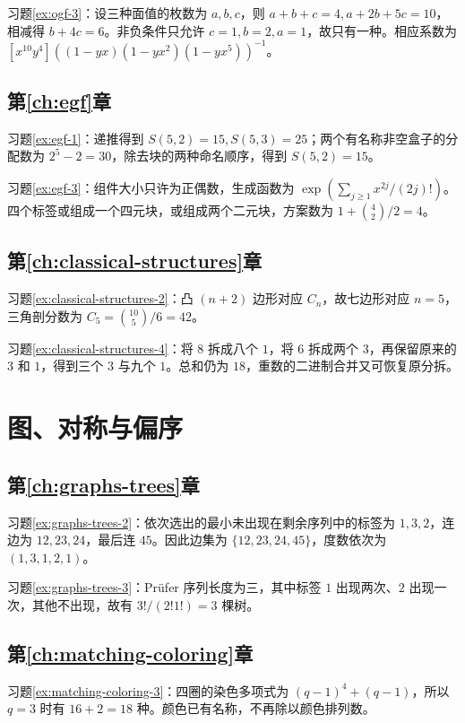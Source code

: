 习题\ref{ex:ogf-3}：设三种面值的枚数为 $a,b,c$，则 $a+b+c=4,a+2b+5c=10$，相减得 $b+4c=6$。非负条件只允许 $c=1,b=2,a=1$，故只有一种。相应系数为 $[x^{10}y^4]((1-yx)(1-yx^2)(1-yx^5))^{-1}$。

\subsection{第\ref{ch:egf}章}

习题\ref{ex:egf-1}：递推得到 $S(5,2)=15,S(5,3)=25$；两个有名称非空盒子的分配数为 $2^5-2=30$，除去块的两种命名顺序，得到 $S(5,2)=15$。

习题\ref{ex:egf-3}：组件大小只许为正偶数，生成函数为 $\exp(\sum_{j\ge1}x^{2j}/(2j)!)$。四个标签或组成一个四元块，或组成两个二元块，方案数为 $1+\binom42/2=4$。

\subsection{第\ref{ch:classical-structures}章}

习题\ref{ex:classical-structures-2}：凸 $(n+2)$ 边形对应 $C_n$，故七边形对应 $n=5$，三角剖分数为 $C_5=\binom{10}{5}/6=42$。

习题\ref{ex:classical-structures-4}：将 $8$ 拆成八个 $1$，将 $6$ 拆成两个 $3$，再保留原来的 $3$ 和 $1$，得到三个 $3$ 与九个 $1$。总和仍为 $18$，重数的二进制合并又可恢复原分拆。

\section{图、对称与偏序}

\subsection{第\ref{ch:graphs-trees}章}

习题\ref{ex:graphs-trees-2}：依次选出的最小未出现在剩余序列中的标签为 $1,3,2$，连边为 $12,23,24$，最后连 $45$。因此边集为 $\{12,23,24,45\}$，度数依次为 $(1,3,1,2,1)$。

习题\ref{ex:graphs-trees-3}：Pr\"ufer 序列长度为三，其中标签 $1$ 出现两次、$2$ 出现一次，其他不出现，故有 $3!/(2!1!)=3$ 棵树。

\subsection{第\ref{ch:matching-coloring}章}

习题\ref{ex:matching-coloring-3}：四圈的染色多项式为 $(q-1)^4+(q-1)$，所以 $q=3$ 时有 $16+2=18$ 种。颜色已有名称，不再除以颜色排列数。

